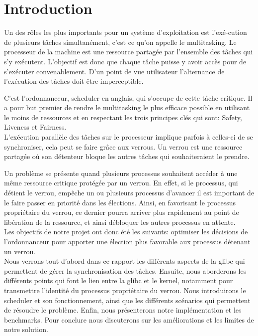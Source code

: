 \section{Introduction}

Un des rôles les plus importants pour un système d'exploitation est
l'exé-cution de plusieurs tâches simultanément, c'est ce qu'on
appelle le multitasking. Le processeur de la machine est une ressource
partagée par l'ensemble des tâches qui s'y exécutent. L'objectif est donc
que chaque tâche puisse y avoir accès pour de s'exécuter 
convenablement. D'un point de vue utilisateur l'alternance de l'exécution
des tâches doit être imperceptible.

C'est l'ordonnanceur, scheduler en anglais, qui s'occupe de cette tâche
critique. Il a pour but premier de rendre le multitasking le plus efficace
possible en utilisant le moins de ressources et en respectant les trois principes
clés qui sont: Safety, Liveness et Fairness.
\\

L'exécution parallèle des tâches sur le processeur implique parfois à celles-ci
de se synchroniser, cela peut se faire grâce aux verrous. Un verrou est une
ressource partagée où son détenteur bloque les autres tâches qui
souhaiteraient le prendre. 

Un problème se présente quand plusieurs processus souhaitent accéder à une même
ressource critique protégée par un verrou. 
En effet, si le processus, qui détient le verrou, empêche un ou plusieurs processus 
d'avancer il est important de le faire passer en priorité dans les 
élections. Ainsi, en favorisant le processus propriétaire du verrou, ce dernier 
pourra arriver plus rapidement au point de libération de la ressource, et ainsi 
débloquer les autres processus en attente.
\\

Les objectifs de notre projet ont donc été les suivants: optimiser les
décisions de l'ordonnanceur pour apporter une élection plus favorable aux
processus détenant un verrou.
\\


Nous verrons tout d'abord dans ce rapport les différents aspects de la glibc
qui permettent de gérer la synchronisation des tâches. Ensuite, nous aborderons
les différents points qui font le lien entre la glibc et le kernel, notamment
pour transmettre l'identité du processus propriétaire du verrou. Nous introduirons
le scheduler et son fonctionnement, ainsi que les différents scénarios qui permettent
de résoudre le problème. Enfin, nous présenterons notre implémentation et les
benchmarks. Pour conclure nous discuterons sur les améliorations et les limites de notre solution.

